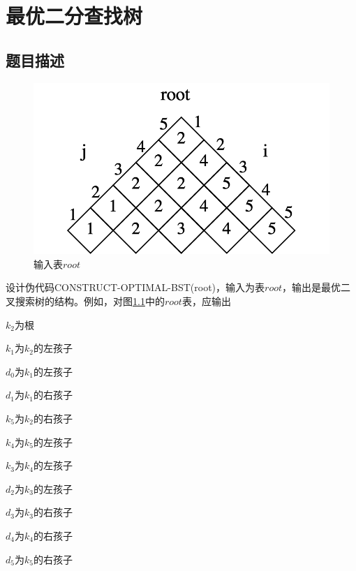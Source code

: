 \documentclass{report}
\begin{document}
\chapter{最优二分查找树}
\label{cha:zui_you_er_fen_cha_zhao_shu_}

\section{题目描述}
\label{sec:ti_mu_miao_shu_3}

\begin{figure}[ht]
    \centering
    \includegraphics[width=0.35\linewidth]{description3.png}
    \caption{输入表$root$}
    \label{fig:description3}
\end{figure}
设计伪代码CONSTRUCT-OPTIMAL-BST(root)，输入为表$root$，输出是最优二叉搜索树的结构。例如，对图\ref{fig:description3}中的$root$表，应输出\par
$k_2$为根\par
$k_1$为$k_2$的左孩子\par
$d_0$为$k_1$的左孩子\par
$d_1$为$k_1$的右孩子\par
$k_5$为$k_2$的右孩子\par
$k_4$为$k_5$的左孩子\par
$k_3$为$k_4$的左孩子\par
$d_2$为$k_3$的左孩子\par
$d_3$为$k_3$的右孩子\par
$d_4$为$k_4$的右孩子\par
$d_5$为$k_5$的右孩子\par
\end{document}

